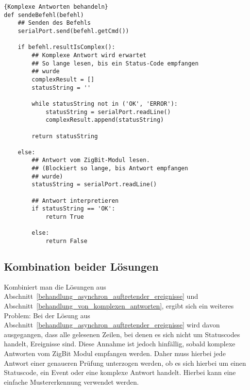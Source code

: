             \begin{lstlisting}{Komplexe Antworten behandeln}
def sendeBefehl(befehl)
    ## Senden des Befehls
    serialPort.send(befehl.getCmd())

    if befehl.resultIsComplex():
        ## Komplexe Antwort wird erwartet
        ## So lange lesen, bis ein Status-Code empfangen
        ## wurde
        complexResult = []
        statusString = ''

        while statusString not in ('OK', 'ERROR'):
            statusString = serialPort.readLine()
            complexResult.append(statusString)

        return statusString

    else:
        ## Antwort vom ZigBit-Modul lesen.
        ## (Blockiert so lange, bis Antwort empfangen 
        ## wurde)
        statusString = serialPort.readLine()

        ## Antwort interpretieren
        if statusString == 'OK':
            return True
        
        else:
            return False

            \end{lstlisting}

        \subsection{Kombination beider Lösungen}

        Kombiniert man die Lösungen aus Abschnitt~\ref{behandlung_asynchron_auftretender_ereignisse} und 
        Abschnitt~\ref{behandlung_von_komplexen_antworten}, ergibt sich ein weiteres Problem: Bei der
        Lösung aus Abschnitt~\ref{behandlung_asynchron_auftretender_ereignisse} wird davon ausgegangen, 
        dass alle gelesenen Zeilen, bei denen es sich nicht um Statuscodes handelt, Ereignisse sind. Diese Annahme
        ist jedoch hinfällig, sobald komplexe Antworten vom ZigBit Modul empfangen werden. Daher muss hierbei
        jede Antwort einer genaueren Prüfung unterzogen werden, ob es sich hierbei um einen Statuscode, 
        ein Event oder eine komplexe Antwort handelt. Hierbei kann eine einfache Mustererkennung verwendet
        werden.


